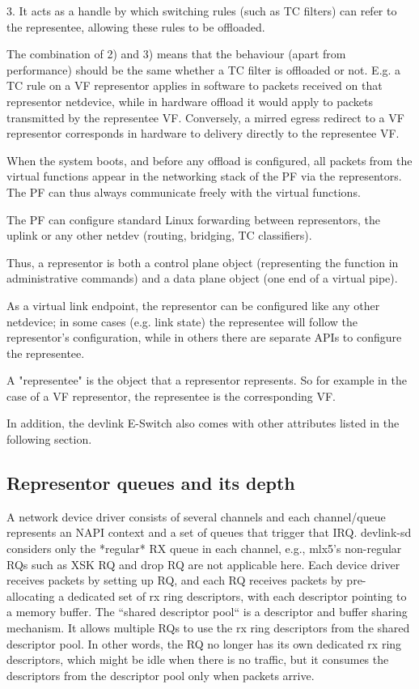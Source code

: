 \documentclass[letterpaper]{article}
\begin{document}
 3. It acts as a handle by which switching rules (such as TC filters) can refer
 to the representee, allowing these rules to be offloaded.

 
 The combination of 2) and 3) means that the behaviour (apart from performance)
 should be the same whether a TC filter is offloaded or not.  E.g. a TC rule
 on a VF representor applies in software to packets received on that representor
 netdevice, while in hardware offload it would apply to packets transmitted by
  the representee VF.  Conversely, a mirred egress redirect to a VF representor
  corresponds in hardware to delivery directly to the representee VF.
 
When the system boots, and before any offload is configured, all packets from
the virtual functions appear in the networking stack of the PF via the
representors.  The PF can thus always communicate freely with the virtual functions.

The PF can configure standard Linux forwarding between representors, the uplink
or any other netdev (routing, bridging, TC classifiers).

Thus, a representor is both a control plane object (representing the function in
administrative commands) and a data plane object (one end of a virtual pipe).

As a virtual link endpoint, the representor can be configured like any other
netdevice; in some cases (e.g. link state) the representee will follow the
representor's configuration, while in others there are separate APIs to
configure the representee.
 
A "representee" is the object that a representor represents.  So for example in
the case of a VF representor, the representee is the corresponding VF.

In addition, the devlink E-Switch also comes with other attributes listed
in the following section.

\subsection{Representor queues and its depth}
A network device driver consists of several channels and each channel/queue
represents an NAPI context and a set of queues that trigger that IRQ.
devlink-sd considers only the *regular* RX queue in each channel,
e.g., mlx5's non-regular RQs such as XSK RQ and drop RQ are not applicable
here. Each device driver receives packets by setting up RQ, and
each RQ receives packets by pre-allocating a dedicated set of rx
ring descriptors, with each descriptor pointing to a memory buffer.
The ``shared descriptor pool`` is a descriptor and buffer sharing
mechanism. It allows multiple RQs to use the rx ring descriptors
from the shared descriptor pool. In other words, the RQ no longer has
its own dedicated rx ring descriptors, which might be idle when there
is no traffic, but it consumes the descriptors from the descriptor
pool only when packets arrive.
\end{document}
